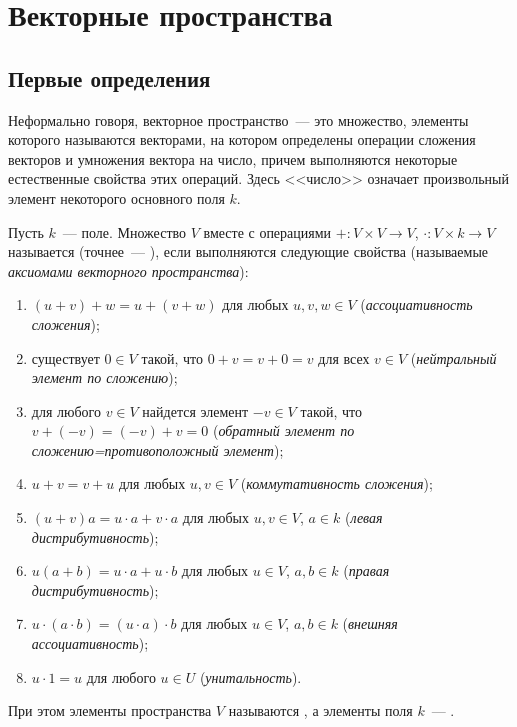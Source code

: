 



\section{Векторные пространства}\label{section_vector_spaces}

\subsection{Первые определения}

Неформально говоря, векторное пространство~--- это множество, элементы
которого называются векторами, на котором определены операции сложения
векторов и умножения вектора на число, причем выполняются некоторые
естественные свойства этих операций. Здесь <<число>> означает
произвольный элемент некоторого основного поля $k$.
\begin{definition}\label{def:vector_space}
Пусть $k$~--- поле.
Множество $V$ вместе с операциями $+\colon V\times V\to V$,
$\cdot\colon V\times k\to V$ называется 
(точнее~--- ),
если выполняются следующие свойства (называемые {\em аксиомами
  векторного пространства}):
\begin{enumerate}
\item $(u+v)+w=u+(v+w)$ для любых $u,v,w\in V$ ({\em ассоциативность сложения});
\item существует $0\in V$ такой, что $0+v=v+0=v$ для всех $v\in V$
  ({\em нейтральный элемент по сложению});
\item для любого $v\in V$ найдется элемент $-v\in V$ такой, что
  $v+(-v)=(-v)+v=0$ ({\em обратный элемент по сложению=противоположный
    элемент});
\item $u+v=v+u$ для любых $u,v\in V$ ({\em коммутативность сложения});
\item $(u+v)a=u\cdot a+v\cdot a$ для любых $u,v\in V$,
  $a\in k$ ({\em левая дистрибутивность});
\item $u(a+b) = u\cdot a + u\cdot b$ для любых $u\in V$,
  $a,b\in k$ ({\em правая дистрибутивность});
\item $u\cdot(a\cdot b)=(u\cdot a)\cdot b$ для любых $u\in V$,
  $a,b\in k$ ({\em внешняя ассоциативность});
\item $u\cdot 1 = u$ для любого $u\in U$ ({\em унитальность}).
\end{enumerate}
При этом элементы пространства $V$ называются
, а
элементы поля $k$~--- .
\end{definition}

